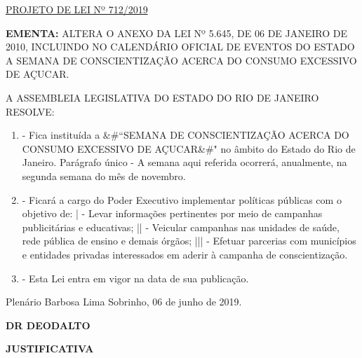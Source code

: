\documentclass[10pt]{article}
\date{}
\begin{document}
\maketitle
\begin{center}
  \huge
  \vspace{-3cm}\href{http://alerjln1.alerj.rj.gov.br/scpro1923.nsf/f4b46b3cdbba990083256cc900746cf6/514543173675750c8325841000777017?OpenDocument}{PROJETO DE LEI Nº 712/2019}
\bigskip
\bigskip
\bigskip
  
\end{center}

\textbf{EMENTA:} 
ALTERA O ANEXO DA LEI Nº 5.645, DE 06 DE JANEIRO DE 2010, INCLUINDO NO CALENDÁRIO OFICIAL DE EVENTOS DO ESTADO A SEMANA DE CONSCIENTIZAÇÃO ACERCA DO CONSUMO EXCESSIVO DE AÇUCAR.








\bigskip

\noindent
A ASSEMBLEIA LEGISLATIVA DO ESTADO DO RIO DE JANEIRO RESOLVE:

\begin{enumerate}[label=Art. \arabic*\textdegree]

\item - Fica instituída a &#``SEMANA DE CONSCIENTIZAÇÃO ACERCA DO CONSUMO EXCESSIVO DE AÇUCAR&#" no âmbito do Estado do Rio de Janeiro.
Parágrafo único - A semana aqui referida ocorrerá, anualmente, na segunda semana do mês de novembro.
\item - Ficará a cargo do Poder Executivo implementar políticas públicas com o objetivo de:
| - Levar informações pertinentes por meio de campanhas publicitárias e educativas;
|| - Veicular campanhas nas unidades de saúde, rede pública de ensino e demais órgãos;
||| - Efetuar parcerias com municípios e entidades privadas interessados em aderir à campanha de conscientização.
\item - Esta Lei entra em vigor na data de sua publicação.





\end{enumerate}




\begin{center}
  Plenário Barbosa Lima Sobrinho, 06 de junho de 2019.

   \bigskip

  \textbf{ DR DEODALTO}

  \bigskip

  \textbf{JUSTIFICATIVA}
  \bigskip

\end{center}
\end{document}
